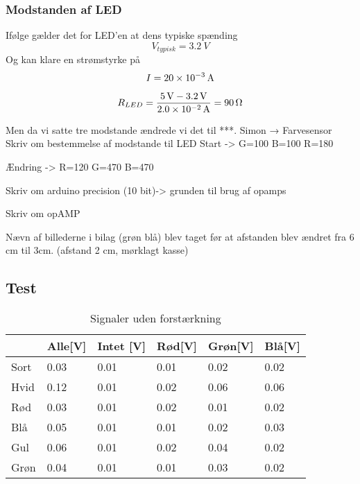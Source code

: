 \subsubsection{Modstanden af LED}
Ifølge \cite{LED??} gælder det for LED'en at dens typiske spænding 
\[
	V_{typisk} = \SI{3.2}{V}
\]
Og kan klare en strømstyrke på
\[
	I = \SI{20d-3}{A} 
\]

\begin{align}
	R_{LED} &= \frac{\SI{5}{V}-\SI{3.2}{V}}{\SI{2.0d-2}{A}} = \SI{90}{\ohm}\\
\end{align}


Men da vi satte tre modstande ændrede vi det til ***. 
Simon → Farvesensor
Skriv om bestemmelse af modstande til LED
Start ->
G=100
B=100
R=180

Ændring ->
R=120
G=470
B=470

Skriv om arduino precision (10 bit)-> grunden til brug af opamps

Skriv om opAMP


Nævn af billederne i bilag (grøn blå) blev taget før at afstanden blev ændret fra 6 cm til 3cm.
(afstand 2 cm, mørklagt kasse)
\subsection{Test}
\begin{table}[H]
\centering
\caption{Signaler uden forstærkning} \label{tab:farveudenforstaerker}
\label{my-label}
\begin{tabular}{l|lllll}
\hline \hline
     & Alle{[\si{V}]} & Intet {[\si{V}]} & Rød{[\si{V}]} & Grøn{[\si{V}]} & Blå{[\si{V}]} \\
     \hline
Sort & 0.03        & 0.01          & 0.01       & 0.02        & 0.02       \\
Hvid & 0.12        & 0.01          & 0.02       & 0.06        & 0.06       \\
Rød  & 0.03        & 0.01          & 0.02       & 0.01        & 0.02       \\
Blå  & 0.05        & 0.01          & 0.01       & 0.02        & 0.03       \\
Gul  & 0.06        & 0.01          & 0.02       & 0.04        & 0.02       \\
Grøn & 0.04        & 0.01          & 0.01       & 0.03        & 0.02 \\[1ex]
\hline     
\end{tabular}
\end{table}

